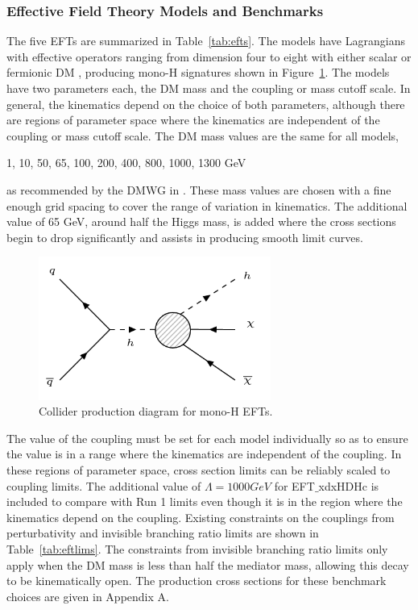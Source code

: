 \subsubsection{Effective Field Theory Models and Benchmarks}

The five EFTs are summarized in Table~\ref{tab:efts}. The models have Lagrangians with effective operators ranging from dimension four to eight with either scalar or fermionic DM \cite{McDonald:1993ex, LopezHonorez:2012kv}, producing mono-H signatures shown in Figure~\ref{fig:eftsig}. The models have two parameters each, the DM mass and the coupling or mass cutoff scale. In general, the kinematics depend on the choice of both parameters, although there are regions of parameter space where the kinematics are independent of the coupling or mass cutoff scale. The DM mass values are the same for all models, 
\begin{center}
1, 10, 50, 65, 100, 200, 400, 800, 1000, 1300 GeV
\end{center}
as recommended by the DMWG in \cite{Abercrombie:2015wmb}. These mass values are chosen with a fine enough grid spacing to cover the range of variation in kinematics. The additional value of 65 GeV, around half the Higgs mass, is added where the cross sections begin to drop significantly and assists in producing smooth limit curves.

\begin{figure}[tbh]
\centering
\includegraphics[width=3in]{figures/eftsig.png}
\caption{Collider production diagram for mono-H EFTs.}
\label{fig:eftsig}
\end{figure}

The value of the coupling must be set for each model individually so as to ensure the value is in a range where the kinematics are independent of the coupling. In these regions of parameter space, cross section limits can be reliably scaled to coupling limits. The additional value of $\Lambda = 1000 GeV$ for EFT$\_$xdxHDHc is included to compare with Run 1 limits even though it is in the region where the kinematics depend on the coupling. Existing constraints on the couplings from perturbativity \cite{Carpenter:2013xra} and invisible branching ratio limits \cite{Belanger:2013kya, PhysRevD.86.010001} are shown in Table~\ref{tab:eftlims}. The constraints from invisible branching ratio limits only apply when the DM mass is less than half the mediator mass, allowing this decay to be kinematically open. The production cross sections for these benchmark choices are given in Appendix A.


